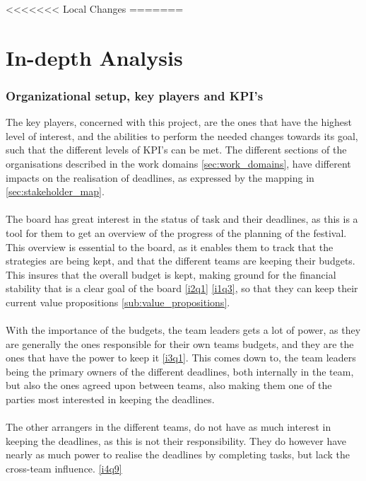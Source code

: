 <<<<<<< Local Changes
=======
\part{In-depth Analysis}
\label{prt:in_depth_analysis}
\section{Organizational setup, key players and KPI's}
The key players, concerned with this project, are the ones that have the highest level of interest, and the abilities to perform the needed changes towards its goal, such that the different levels of KPI's can be met. The different sections of the organisations described in the work domains \ref{sec:work_domains}, have different impacts on the realisation of deadlines, as expressed by the mapping in \ref{sec:stakeholder_map}.
\\ \\
The board has great interest in the status of task and their deadlines, as this is a tool for them to get an overview of the progress of the planning of the festival. This overview is essential to the board, as it enables them to track that the strategies are being kept, and that the different teams are keeping their budgets. This insures that the overall budget is kept, making ground for the financial stability that is a clear goal of the board \ref{i2q1} \ref{i1q3}, so that they can keep their current value propositions \ref{sub:value_propositions}.
\\ \\
With the importance of the budgets, the team leaders gets a lot of power, as they are generally the ones responsible for their own teams budgets, and they are the ones that have the power to keep it \ref{i3q1}. This comes down to, the team leaders being the primary owners of the different deadlines, both internally in the team, but also the ones agreed upon between teams, also making them one of the parties most interested in keeping the deadlines.
\\ \\
The other arrangers in the different teams, do not have as much interest in keeping the deadlines, as this is not their responsibility. They do however have nearly as much power to realise the deadlines by completing tasks, but lack the cross-team influence. \ref{i4q9}


